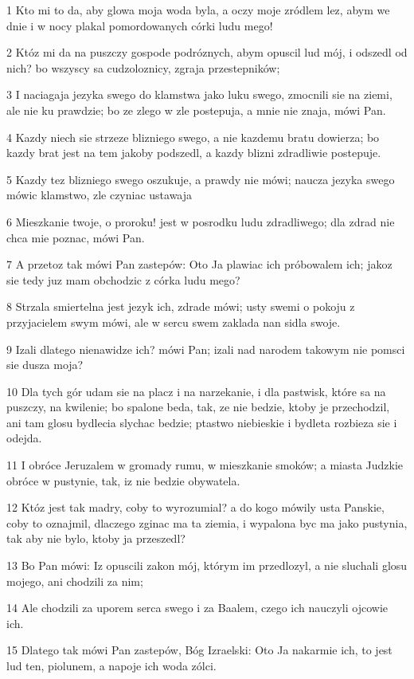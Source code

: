 \par 1 Kto mi to da, aby glowa moja woda byla, a oczy moje zródlem lez, abym we dnie i w nocy plakal pomordowanych córki ludu mego!
\par 2 Któz mi da na puszczy gospode podróznych, abym opuscil lud mój, i odszedl od nich? bo wszyscy sa cudzoloznicy, zgraja przestepników;
\par 3 I naciagaja jezyka swego do klamstwa jako luku swego, zmocnili sie na ziemi, ale nie ku prawdzie; bo ze zlego w zle postepuja, a mnie nie znaja, mówi Pan.
\par 4 Kazdy niech sie strzeze blizniego swego, a nie kazdemu bratu dowierza; bo kazdy brat jest na tem jakoby podszedl, a kazdy blizni zdradliwie postepuje.
\par 5 Kazdy tez blizniego swego oszukuje, a prawdy nie mówi; naucza jezyka swego mówic klamstwo, zle czyniac ustawaja
\par 6 Mieszkanie twoje, o proroku! jest w posrodku ludu zdradliwego; dla zdrad nie chca mie poznac, mówi Pan.
\par 7 A przetoz tak mówi Pan zastepów: Oto Ja plawiac ich próbowalem ich; jakoz sie tedy juz mam obchodzic z córka ludu mego?
\par 8 Strzala smiertelna jest jezyk ich, zdrade mówi; usty swemi o pokoju z przyjacielem swym mówi, ale w sercu swem zaklada nan sidla swoje.
\par 9 Izali dlatego nienawidze ich? mówi Pan; izali nad narodem takowym nie pomsci sie dusza moja?
\par 10 Dla tych gór udam sie na placz i na narzekanie, i dla pastwisk, które sa na puszczy, na kwilenie; bo spalone beda, tak, ze nie bedzie, ktoby je przechodzil, ani tam glosu bydlecia slychac bedzie; ptastwo niebieskie i bydleta rozbieza sie i odejda.
\par 11 I obróce Jeruzalem w gromady rumu, w mieszkanie smoków; a miasta Judzkie obróce w pustynie, tak, iz nie bedzie obywatela.
\par 12 Któz jest tak madry, coby to wyrozumial? a do kogo mówily usta Panskie, coby to oznajmil, dlaczego zginac ma ta ziemia, i wypalona byc ma jako pustynia, tak aby nie bylo, ktoby ja przeszedl?
\par 13 Bo Pan mówi: Iz opuscili zakon mój, którym im przedlozyl, a nie sluchali glosu mojego, ani chodzili za nim;
\par 14 Ale chodzili za uporem serca swego i za Baalem, czego ich nauczyli ojcowie ich.
\par 15 Dlatego tak mówi Pan zastepów, Bóg Izraelski: Oto Ja nakarmie ich, to jest lud ten, piolunem, a napoje ich woda zólci.
